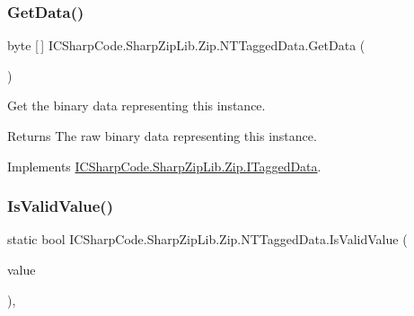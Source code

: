 \subsubsection{\texorpdfstring{Get\+Data()}{GetData()}\hspace{0.1cm}{\footnotesize\ttfamily [2/2]}}
{\footnotesize\ttfamily byte \mbox{[}$\,$\mbox{]} I\+C\+Sharp\+Code.\+Sharp\+Zip\+Lib.\+Zip.\+N\+T\+Tagged\+Data.\+Get\+Data (\begin{DoxyParamCaption}{ }\end{DoxyParamCaption})\hspace{0.3cm}{\ttfamily [inline]}}



Get the binary data representing this instance. 

\begin{DoxyReturn}{Returns}
The raw binary data representing this instance.
\end{DoxyReturn}


Implements \hyperlink{interface_i_c_sharp_code_1_1_sharp_zip_lib_1_1_zip_1_1_i_tagged_data_a1534d99dec9f2bc6652875e66fba50e6}{I\+C\+Sharp\+Code.\+Sharp\+Zip\+Lib.\+Zip.\+I\+Tagged\+Data}.

\mbox{\label{class_i_c_sharp_code_1_1_sharp_zip_lib_1_1_zip_1_1_n_t_tagged_data_ae4fe23410bbadf234c3ba5bcb888dcf0}} 
\subsubsection{\texorpdfstring{Is\+Valid\+Value()}{IsValidValue()}\hspace{0.1cm}{\footnotesize\ttfamily [1/2]}}
{\footnotesize\ttfamily static bool I\+C\+Sharp\+Code.\+Sharp\+Zip\+Lib.\+Zip.\+N\+T\+Tagged\+Data.\+Is\+Valid\+Value (\begin{DoxyParamCaption}\item[{Date\+Time}]{value }\end{DoxyParamCaption})\hspace{0.3cm}{\ttfamily [inline]}, {\ttfamily [static]}}



